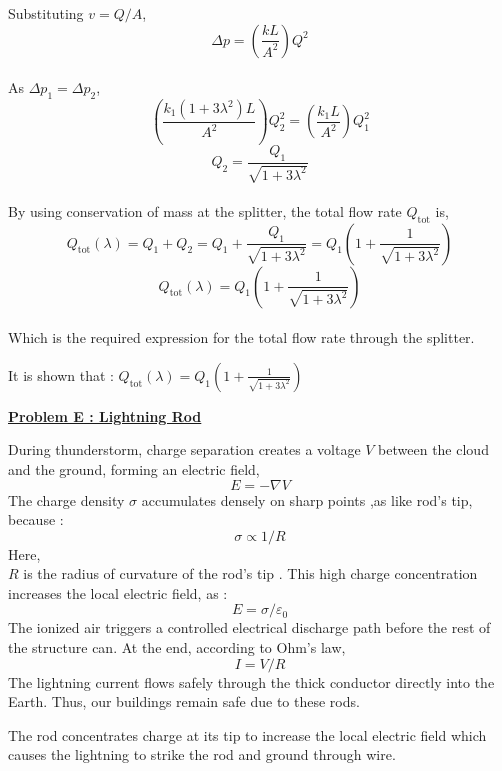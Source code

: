 \documentclass{article}
\begin{document}
Substituting $v = Q/A$,
$$ \Delta p = \left(\frac{k L}{A^2}\right) Q^2 $$ \\

As $\Delta p_1=\Delta p_2$,
$$\left(\frac{k_1(1 + 3\lambda^2) L}{A^2}\right) Q_2^2=\left(\frac{k_1 L}{A^2}\right) Q_1^2$$
$$ Q_2 = \frac{Q_1}{\sqrt{1 + 3\lambda^2}}$$\\

By using conservation of mass at the splitter, the total flow rate $Q_{\text{tot}}$ is,
$$Q_{\text{tot}}(\lambda) = Q_1 + Q_2= Q_1 + \frac{Q_1}{\sqrt{1 + 3\lambda^2}}= Q_1 \left( 1 + \frac{1}{\sqrt{1 + 3\lambda^2}} \right)$$
$$Q_{\text{tot}}(\lambda) =Q_1 \left( 1 + \frac{1}{\sqrt{1 + 3\lambda^2}} \right) $$\\
Which is the required expression for the total flow rate through the splitter.
\begin{tcolorbox}[
    enhanced,
    attach boxed title to top center={yshift=-3mm,yshifttext=-1mm},
    colback=black,
    colframe=aquamarine!50!aquablue,
    coltitle=blue!70!black,
    colbacktitle=aquablue,
    title=Answer,
    fonttitle=\bfseries,
    boxed title style={size=small,colframe=blue},
    coltext=ivory!85!aquablue
]
  \centerline{It is shown that : $ Q_{\text{tot}}(\lambda) =Q_1 \left( 1 + \frac{1}{\sqrt{1 + 3\lambda^2}} \right)$}
\end{tcolorbox}
\newpage


\begin{center}
    {\large \bfseries \color{aquablue!80!blue} \underline{Problem E : Lightning Rod}}
\end{center}
During thunderstorm, charge separation creates a voltage \(V\) between the cloud and the ground, forming an electric field,
$$E = -\nabla V$$ 
The charge density \( \sigma \) accumulates densely on sharp points ,as like rod's tip, because :
$$\sigma \propto 1/R$$
Here,\\
\(R\) is the radius of curvature of the rod's tip . This high charge concentration increases the local electric field, as :
$$E = \sigma/\varepsilon_0$$
 The ionized air triggers a controlled electrical discharge path before the rest of the structure can. At the end, according to Ohm’s law,
 $$I = V/R$$
 The lightning current flows safely through the thick conductor directly into the Earth. Thus, our buildings remain safe due to these rods.

\begin{tcolorbox}[
    enhanced,
    attach boxed title to top center={yshift=-3mm,yshifttext=-1mm},
    colback=black,
    colframe=aquamarine!50!aquablue,
    coltitle=blue!70!black,
    colbacktitle=aquablue,
    title=Answer,
    fonttitle=\bfseries,
    boxed title style={size=small,colframe=blue},
    coltext=ivory!85!aquablue
]
  The rod concentrates charge at its tip to increase the local electric field which causes the lightning to strike the rod and ground through wire.
\end{tcolorbox}
\end{document}
